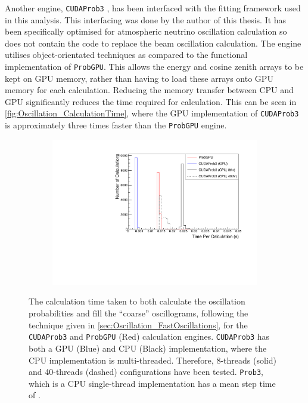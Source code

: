 Another engine, \texttt{CUDAProb3} \cite{cudaprob3}, has been interfaced with the fitting framework used in this analysis. This interfacing was done by the author of this thesis. It has been specifically optimised for atmospheric neutrino oscillation calculation so does not contain the code to replace the beam oscillation calculation. The engine utilises object-orientated techniques as compared to the functional implementation of \texttt{ProbGPU}. This allows the energy and cosine zenith arrays to be kept on GPU memory, rather than having to load these arrays onto GPU memory for each calculation. Reducing the memory transfer between CPU and GPU significantly reduces the time required for calculation. This can be seen in \autoref{fig:Oscillation_CalculationTime}, where the GPU implementation of \texttt{CUDAProb3} is approximately three times faster than the \texttt{ProbGPU} engine. 

\begin{figure}[h]
  \begin{subfigure}[t]{0.8\textwidth}
    \includegraphics[width=\textwidth, trim={0mm 0mm 0mm 0mm}, clip,page=1]{Figures/Oscillation/CalculationTime.pdf}
  \end{subfigure}
  \caption{The calculation time taken to both calculate the oscillation probabilities and fill the ``coarse'' oscillograms, following the technique given in \autoref{sec:Oscillation_FastOscillations},  for the \texttt{CUDAProb3} and \texttt{ProbGPU} (Red) calculation engines. \texttt{CUDAProb3} has both a GPU (Blue) and CPU (Black) implementation, where the CPU implementation is multi-threaded. Therefore, 8-threads (solid) and 40-threads (dashed) configurations have been tested. \texttt{Prob3}, which is a CPU single-thread implementation has a mean step time of .}
  \label{fig:Oscillation_CalculationTime}
\end{figure}

